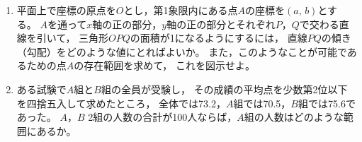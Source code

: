 \begin{problem}
    \begin{enumerate}
\item 平面上で座標の原点を$O$とし，第1象限内にある点$A$の座標を$(a, \, b)$とする。
$A$を通って$x$軸の正の部分，$y$軸の正の部分とそれぞれ$P$，$Q$で交わる直線を引いて，
三角形$OPQ$の面積が1になるようにするには，
直線$PQ$の傾き（勾配）をどのような値にとればよいか。
また，このようなことが可能であるための点$A$の存在範囲を求めて，
これを図示せよ。
\item ある試験で$A$組と$B$組の全員が受験し，
その成績の平均点を少数第2位以下を四捨五入して求めたところ，
全体では73.2，$A$組では70.5，$B$組では75.6であった。
$A$，$B$ 2組の人数の合計が100人ならば，$A$組の人数はどのような範囲にあるか。
\end{enumerate}
\end{problem}

